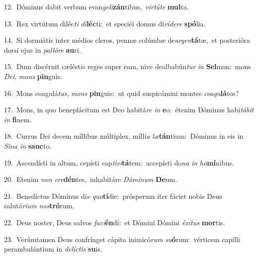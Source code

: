 {\numbfont\textcolor{\numbcolor}{12.}}~Dóminus dabit verbum evan\-\textit{ge}\-\textit{li}\textbf{zán}tibus,~\star \textit{vir}\-\textit{tú}\textit{te} \textbf{mul}\-ta.\par
{\numbfont\textcolor{\numbcolor}{13.}}~Rex virtútum diléc\textit{ti} \textit{di}\-\textbf{léc}ti:~\star et speciéi domus di\-\textit{ví}\-\textit{de}\textit{re} \textbf{spó}\-lia.\par
{\numbfont\textcolor{\numbcolor}{14.}}~Si dormiátis inter médios cleros, pennæ colúmbæ de\-\textit{ar}\-\textit{gen}\textbf{tá}tæ,~\star et posterióra dorsi ejus in \textit{pal}\-\textit{ló}\textit{re} \textbf{au}\-ri.\par
{\numbfont\textcolor{\numbcolor}{15.}}~Dum discérnit cæléstis reges super eam, nive dealbabún\textit{tur} \textit{in} \textbf{Sel}\-mon:~\star mons \textit{De}\-\textit{i}, \textit{mons} \textbf{pin}\-guis.\par
{\numbfont\textcolor{\numbcolor}{16.}}~Mons coagulá\-\textit{tus}\-, \textit{mons} \textbf{pin}\-guis:~\star ut quid suspicámini montes \textit{co}\-\textit{a}\textit{gu}\textbf{lá}tos?\par
{\numbfont\textcolor{\numbcolor}{17.}}~Mons, in quo beneplácitum est Deo habitá\textit{re} \textit{in} \textbf{e}\-o:~\star étenim Dóminus habi\-\textit{tá}\-\textit{bit} \textit{in} \textbf{fi}\-nem.\par
{\numbfont\textcolor{\numbcolor}{18.}}~Currus Dei decem míllibus múltiplex, mílli\textit{a} \textit{læ}\-\textbf{tán}tium:~\star Dóminus in eis in \textit{Si}\-\textit{na} \textit{in} \textbf{sanc}\-to.\par
{\numbfont\textcolor{\numbcolor}{19.}}~Ascendísti in altum, cepísti cap\-\textit{ti}\-\textit{vi}\textbf{tá}tem:~\star accepísti do\textit{na} \textit{in} \textit{ho}\-\textbf{mí}nibus.\par
{\numbfont\textcolor{\numbcolor}{20.}}~Etenim \textit{non} \textit{cre}\-\textbf{dén}tes,~\star inhabitáre \textit{Dó}\-\textit{mi}\textit{num} \textbf{De}\-um.\par
{\numbfont\textcolor{\numbcolor}{21.}}~Benedíctus Dóminus di\textit{e} \textit{quo}\-\textbf{tí}die:~\star prósperum iter fáciet nobis Deus salutá\-\textit{ri}\-\textit{um} \textit{nos}\-\textbf{tró}rum.\par
{\numbfont\textcolor{\numbcolor}{22.}}~Deus noster, Deus salvos \textit{fa}\-\textit{ci}\textbf{én}di:~\star et Dómini Dómini \textit{éx}\-\textit{i}\textit{tus} \textbf{mor}\-tis.\par
{\numbfont\textcolor{\numbcolor}{23.}}~Verúmtamen Deus confrínget cápita inimicó\textit{rum} \textit{su}\-\textbf{ó}rum:~\star vérticem capílli perambulántium in \textit{de}\-\textit{líc}\textit{tis} \textbf{su}\-is.\par

